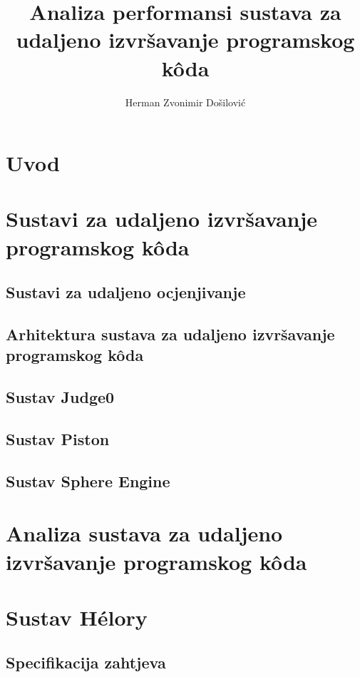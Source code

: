 \documentclass[times, utf8, diplomski]{fer}
\begin{document}

\title{Analiza performansi sustava za udaljeno izvršavanje programskog kôda}

\author{Herman Zvonimir Došilović}

\maketitle



\zahvala{}

\tableofcontents

\chapter{Uvod}

\chapter{Sustavi za udaljeno izvršavanje programskog kôda}
\section{Sustavi za udaljeno ocjenjivanje}
\section{Arhitektura sustava za udaljeno izvršavanje programskog kôda}
\section{Sustav Judge0}
\section{Sustav Piston}
\section{Sustav Sphere Engine}

\chapter{Analiza sustava za udaljeno izvršavanje programskog kôda}

\chapter{Sustav Hélory}
\section{Specifikacija zahtjeva}
\end{document}

